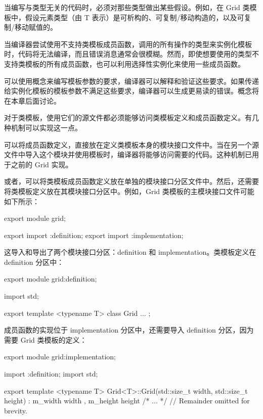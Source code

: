 当编写与类型无关的代码时，必须对那些类型做出某些假设。例如，在 Grid 类模板中，假设元素类型（由 T 表示）是可析构的、可复制/移动构造的，以及可复制/移动赋值的。

当编译器尝试使用不支持类模板成员函数，调用的所有操作的类型来实例化模板时，代码将无法编译，而且错误消息通常会很模糊。然而，即使想要使用的类型不支持类模板的所有成员函数，也可以利用选择性实例化来使用一些成员函数。

可以使用概念来编写模板参数的要求，编译器可以解释和验证这些要求。如果传递给实例化模板的模板参数不满足这些要求，编译器可以生成更易读的错误。概念将在本章后面讨论。


对于类模板，使用它们的源文件都必须能够访问类模板定义和成员函数定义。有几种机制可以实现这一点。


可以将成员函数定义，直接放在定义类模板本身的模块接口文件中。当在另一个源文件中导入这个模块并使用模板时，编译器将能够访问需要的代码。这种机制已用于之前的 Grid 实现。


或者，可以将类模板成员函数定义放在单独的模块接口分区文件中。然后，还需要将类模板定义放在其模块接口分区中。例如，Grid 类模板的主模块接口文件可能如下所示：

\begin{cpp}
export module grid;

export import :definition;
export import :implementation;
\end{cpp}

这导入和导出了两个模块接口分区：definition 和 implementation。类模板定义在 definition 分区中：

\begin{cpp}
export module grid:definition;

import std;

export template <typename T> class Grid { ... };
\end{cpp}

成员函数的实现位于 implementation 分区中，还需要导入 definition 分区，因为需要 Grid 类模板的定义：

\begin{cpp}
export module grid:implementation;

import :definition;
import std;

export template <typename T>
Grid<T>::Grid(std::size_t width, std::size_t height)
    : m_width { width }, m_height { height }
{ /* ... */ }
// Remainder omitted for brevity.
\end{cpp}

